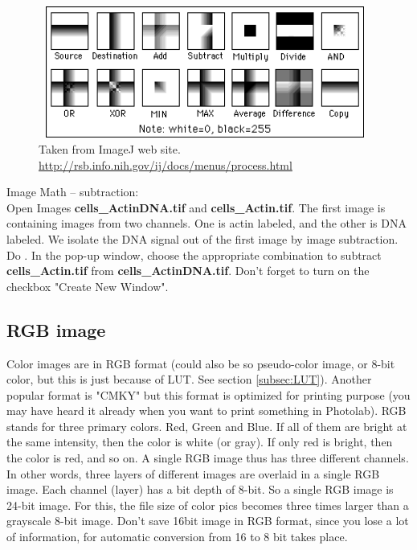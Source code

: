 \begin{figure}[htbp]
\begin{center}
\includegraphics[width=10.945cm,height=4.323cm]{img/CMCIBasicCourse201102-img13.png}
\caption{Taken from ImageJ web site. \url{http://rsb.info.nih.gov/ij/docs/menus/process.html}}
\label{fig:img13}
\end{center}
\end{figure}

\begin{indentexercise}{1}
Image Math -- subtraction:\\
Open Images \textbf{cells\_ActinDNA.tif} and \textbf{cells\_Actin.tif}.
The first image is containing images from two channels. One is actin
labeled, and the other is DNA labeled. We isolate the DNA signal out of
the first image by image subtraction. Do . In the pop-up window, choose the appropriate combination to subtract \textbf{cells\_Actin.tif} from \textbf{cells\_ActinDNA.tif}. Don't forget to turn on the checkbox "Create New Window". 
\end{indentexercise}


\subsection{RGB image}

Color images are in RGB format (could also be so pseudo-color image, or
8-bit color, but this is just because of LUT. See section \ref{subsec:LUT}).
Another popular format is "CMKY" but this
format is optimized for printing purpose (you may have heard it already
when you want to print something in Photolab). RGB stands for three
primary colors. Red, Green and Blue. If all of them are bright at the
same intensity, then the color is white (or gray). If only red is
bright, then the color is red, and so on. A single RGB image thus has
three different channels. In other words, three layers of different
images are overlaid in a single RGB image. Each channel (layer) has a
bit depth of 8-bit. So a single RGB image is 24-bit image. For this,
the file size of color pics becomes three times larger than a grayscale
8-bit image. Don't save 16bit image in RGB format,
since you lose a lot of information, for automatic conversion from 16
to 8 bit takes place. 

